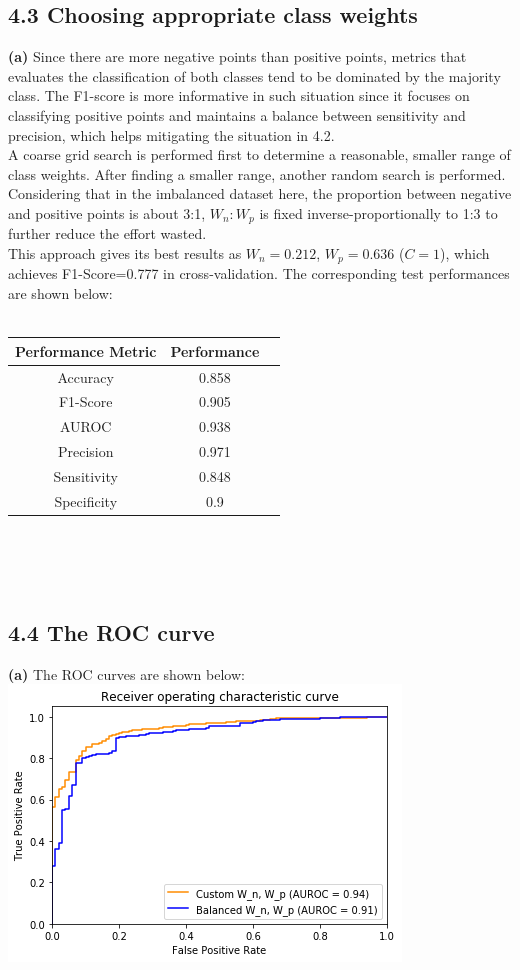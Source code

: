 \documentclass{article}
\begin{document}
\subsection*{4.3 Choosing appropriate class weights}
\textbf{(a)} Since there are more negative points than positive points, metrics that evaluates the classification of both classes tend to be dominated by the majority class. The F1-score is more informative in such situation since it focuses on
classifying positive points and maintains a balance between sensitivity and precision,
which helps mitigating the situation in 4.2. \\
\indent A coarse grid search is performed first to determine a reasonable, smaller range of class weights.
After finding a smaller range, another random search is performed. Considering that in the imbalanced dataset here,
the proportion between negative and positive points is about 3:1, $W_n:W_p$ is fixed inverse-proportionally to 1:3
to further reduce the effort wasted. \\
\indent This approach gives its best results as $W_n=0.212$, $W_p=0.636$ ($C=1$),
which achieves F1-Score=0.777 in cross-validation. The corresponding test performances are shown below: \\\\
\begin{tabular}{|c|c|c|}
\hline
\bf Performance Metric & \bf Performance \\ \hline
Accuracy &  0.858 \\ \hline
F1-Score &  0.905 \\ \hline
AUROC &  0.938 \\ \hline
Precision &  0.971 \\ \hline
Sensitivity &  0.848 \\ \hline
Specificity &  0.9 \\ \hline
\end{tabular}\\ \\\\
\subsection*{4.4 The ROC curve}
\textbf{(a)} The ROC curves are shown below:\\
\includegraphics[width=.5\textwidth]{44.png}\\
\end{document}
